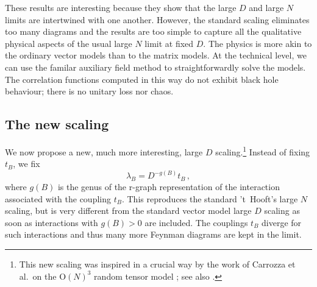 \documentclass[12pt]{article}
\numberwithin{equation}{section}
\def\be{\begin{equation}}\def\ee{\end{equation}}
\begin{document}
These results are interesting because they show that the large $D$ and large $N$ limits are intertwined with one another. However, the standard scaling eliminates too many diagrams and the results are too simple to capture all the qualitative physical aspects of the usual large $N$ limit at fixed $D$. The physics is more akin to the ordinary vector models than to the matrix models. At the technical level, we can use the familar auxiliary field method to straightforwardly solve the models. The correlation functions computed in this way do not exhibit black hole behaviour; there is no unitary loss nor chaos.

%
\subsection{\label{NewScalingResSec} The new scaling}
%

We now propose a new, much more interesting, large $D$ scaling.\footnote{This new scaling was inspired in a crucial way by the work of Carrozza et al.\ on the $\text{O}(N)^{3}$ random tensor model \cite{Carrozzaetal}; see also \cite{Tanasa}.} Instead of fixing $t_{B}$, we fix
%
\be\label{newscaling} \lambda_{B}=D^{-g(B)}t_{B}\, ,\ee
%
where $g(B)$ is the genus of the r-graph representation of the interaction associated with the coupling $t_{B}$. This reproduces the standard 't~Hooft's large $N$ scaling, but is very different from the standard vector model large $D$ scaling as soon as interactions with $g(B)>0$ are included. The couplings $t_{B}$ diverge for such interactions and thus many more Feynman diagrams are kept in the limit. 
\end{document}
